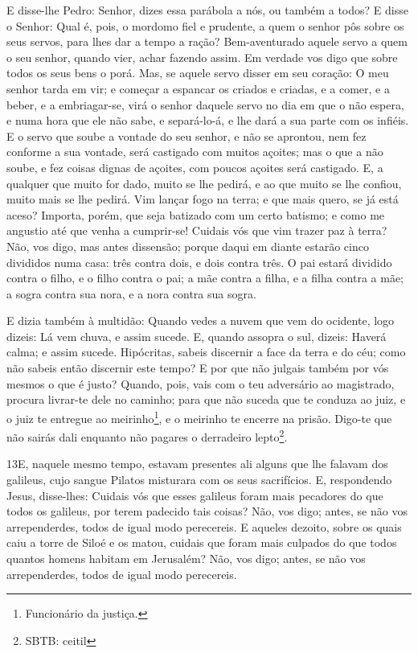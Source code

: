 E disse-lhe Pedro: Senhor, dizes essa parábola a nós, ou também a
todos? E disse o Senhor: Qual é, pois, o mordomo fiel e
prudente, a quem o senhor pôs sobre os seus servos, para lhes dar a
tempo a ração? Bem-aventurado aquele servo a quem o seu
senhor, quando vier, achar fazendo assim. Em verdade vos digo
que sobre todos os seus bens o porá. Mas, se aquele servo
disser em seu coração: O meu senhor tarda em vir; e começar a
espancar os criados e criadas, e a comer, e a beber, e a
embriagar-se, virá o senhor daquele servo no dia em que o não
espera, e numa hora que ele não sabe, e separá-lo-á, e lhe dará a
sua parte com os infiéis. E o servo que soube a vontade do
seu senhor, e não se aprontou, nem fez conforme a sua vontade, será
castigado com muitos açoites; mas o que a não soube, e fez
coisas dignas de açoites, com poucos açoites será castigado. E, a
qualquer que muito for dado, muito se lhe pedirá, e ao que muito se
lhe confiou, muito mais se lhe pedirá. Vim lançar fogo na
terra; e que mais quero, se já está aceso? Importa, porém,
que seja batizado com um certo batismo; e como me angustio até que
venha a cumprir-se! Cuidais vós que vim trazer paz à terra?
Não, vos digo, mas antes dissensão; porque daqui em diante
estarão cinco divididos numa casa: três contra dois, e dois contra
três. O pai estará dividido contra o filho, e o filho contra
o pai; a mãe contra a filha, e a filha contra a mãe; a sogra contra
sua nora, e a nora contra sua sogra.

E dizia também à multidão: Quando vedes a nuvem que vem do
ocidente, logo dizeis: Lá vem chuva, e assim sucede. E,
quando assopra o sul, dizeis: Haverá calma; e assim sucede.
Hipócritas, sabeis discernir a face da terra e do céu; como
não sabeis então discernir este tempo? E por que não julgais
também por vós mesmos o que é justo? Quando, pois, vais com o
teu adversário ao magistrado, procura livrar-te dele no caminho;
para que não suceda que te conduza ao juiz, e o juiz te entregue ao
meirinho\footnote{Funcionário da justiça.}, e o meirinho te encerre
na prisão. Digo-te que não sairás dali enquanto não pagares o
derradeiro lepto\footnote{SBTB: ceitil}.

\medskip

\lettrine{13} E, naquele mesmo tempo, estavam presentes ali
alguns que lhe falavam dos galileus, cujo sangue Pilatos misturara
com os seus sacrifícios. E, respondendo Jesus, disse-lhes:
Cuidais vós que esses galileus foram mais pecadores do que todos os
galileus, por terem padecido tais coisas? Não, vos digo; antes,
se não vos arrependerdes, todos de igual modo perecereis. E
aqueles dezoito, sobre os quais caiu a torre de Siloé e os matou,
cuidais que foram mais culpados do que todos quantos homens habitam
em Jerusalém? Não, vos digo; antes, se não vos arrependerdes,
todos de igual modo perecereis.

